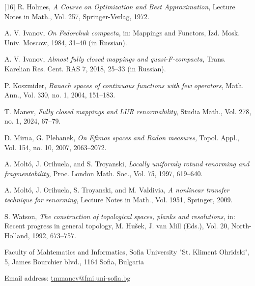 \documentclass[11pt]{article}
\theoremstyle{definition}
\theoremstyle{remark}
\begin{document}
\begin{thebibliography}{[16]}
	 R. Holmes, \emph{A Course on Optimization and Best Approximation}, Lecture Notes in Math., Vol. 257, Springer-Verlag, 1972.
	
	A. V. Ivanov, \emph{On Fedorchuk compacta}, in: Mappings and Functors, Izd. Mosk. Univ. Moscow, 1984, 31--40 (in Russian).
	
	 A. V. Ivanov, \emph{Almost fully closed mappings and quasi-F-compacta}, Trans. Karelian Res. Cent. RAS 7, 2018, 25--33 (in
	Russian).
	
	 P. Koszmider, \emph{Banach spaces of continuous functions with few operators}, Math. Ann., Vol. 330, no. 1, 2004, 151--183.
	
	 T. Manev, \emph{Fully closed mappings and LUR renormability}, Studia Math., Vol. 278, no. 1, 2024, 67--79.
	
	 D. Mirna, G. Plebanek, \emph{On Efimov spaces and Radon measures}, Topol. Appl., Vol. 154, no. 10, 2007, 2063--2072.
	
	 A. Molt\'o, J. Orihuela, and S. Troyanski, \emph{Locally uniformly rotund renorming and fragmentability}, Proc. London Math. Soc., Vol. 75, 1997, 619--640.
	
	 A. Molt\'o, J. Orihuela, S. Troyanski, and M. Valdivia, \emph{A nonlinear transfer technique for renorming}, Lecture Notes in Math., Vol. 1951, Springer, 2009.
	
	 S. Watson, \emph{The construction of topological spaces, planks and resolutions}, in: Recent progress in general topology, M. Hušek, J. van Mill (Eds.), Vol. 20, North-Holland, 1992, 673–757.
	
\end{thebibliography}

Faculty of Mahtematics and Informatics, Sofia University "St. Kliment Ohridski", 5, James Bourchier blvd., 1164 Sofia, Bulgaria

Email address: \href{mailto:tmmanev@fmi.uni-sofia.bg}{tmmanev@fmi.uni-sofia.bg} 
\end{document}
